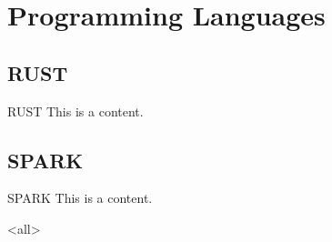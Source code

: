 \chapter{Programming Languages}
\label{chap_languages}

\section{RUST}

\begin{frame}{RUST}
	This is a content.
\end{frame}


\section{SPARK}

\begin{frame}{SPARK}
	This is a content.
\end{frame}



\exercises

\mode
<all>